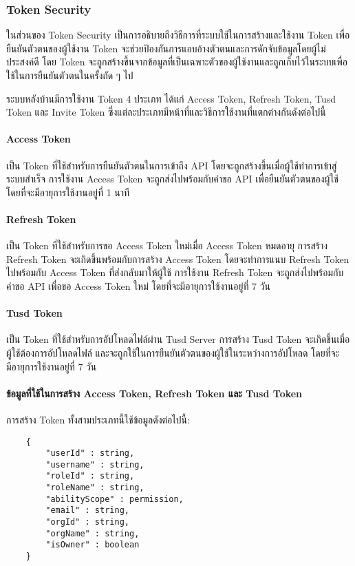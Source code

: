 \subsubsection{Token Security}

\ifenglish
\else
ในส่วนของ Token Security เป็นการอธิบายถึงวิธีการที่ระบบใช้ในการสร้างและใช้งาน Token เพื่อยืนยันตัวตนของผู้ใช้งาน Token จะช่วยป้องกันการแอบอ้างตัวตนและการดักจับข้อมูลโดยผู้ไม่ประสงค์ดี โดย Token จะถูกสร้างขึ้นจากข้อมูลที่เป็นเฉพาะตัวของผู้ใช้งานและถูกเก็บไว้ในระบบเพื่อใช้ในการยืนยันตัวตนในครั้งถัด ๆ ไป

ระบบหลังบ้านมีการใช้งาน Token 4 ประเภท ได้แก่ Access Token, Refresh Token, Tusd Token และ Invite Token ซึ่งแต่ละประเภทมีหน้าที่และวิธีการใช้งานที่แตกต่างกันดังต่อไปนี้

\paragraph{Access Token}
เป็น Token ที่ใช้สำหรับการยืนยันตัวตนในการเข้าถึง API โดยจะถูกสร้างขึ้นเมื่อผู้ใช้ทำการเข้าสู่ระบบสำเร็จ การใช้งาน Access Token จะถูกส่งไปพร้อมกับคำขอ API เพื่อยืนยันตัวตนของผู้ใช้ โดยที่จะมีอายุการใช้งานอยู่ที่ 1 นาที

\paragraph{Refresh Token}
เป็น Token ที่ใช้สำหรับการขอ Access Token ใหม่เมื่อ Access Token หมดอายุ การสร้าง Refresh Token จะเกิดขึ้นพร้อมกับการสร้าง Access Token โดยจะทำการแนบ Refresh Token ไปพร้อมกับ Access Token ที่ส่งกลับมาให้ผู้ใช้ การใช้งาน Refresh Token จะถูกส่งไปพร้อมกับคำขอ API เพื่อขอ Access Token ใหม่ โดยที่จะมีอายุการใช้งานอยู่ที่ 7 วัน

\paragraph{Tusd Token}
เป็น Token ที่ใช้สำหรับการอัปโหลดไฟล์ผ่าน Tusd Server การสร้าง Tusd Token จะเกิดขึ้นเมื่อผู้ใช้ต้องการอัปโหลดไฟล์ และจะถูกใช้ในการยืนยันตัวตนของผู้ใช้ในระหว่างการอัปโหลด โดยที่จะมีอายุการใช้งานอยู่ที่ 7 วัน

\paragraph{ข้อมูลที่ใช้ในการสร้าง Access Token, Refresh Token และ Tusd Token}
การสร้าง Token ทั้งสามประเภทนี้ใช้ข้อมูลดังต่อไปนี้:
\begin{lstlisting}
    {
        "userId" : string,
        "username" : string,
        "roleId" : string,
        "roleName" : string,
        "abilityScope" : permission,
        "email" : string,
        "orgId" : string,
        "orgName" : string,
        "isOwner" : boolean
    }
\end{lstlisting}


